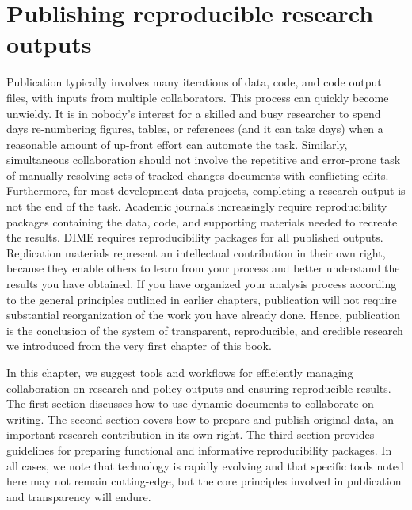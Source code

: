 \documentclass[
]{book}
\begin{document}
\hypertarget{publication}{%
\chapter{Publishing reproducible research outputs}\label{publication}}

Publication typically involves many iterations of
data, code, and code output files, with inputs from multiple collaborators.
This process can quickly become unwieldy.
It is in nobody's interest for a skilled and busy researcher
to spend days re-numbering figures, tables, or references (and it can take days)
when a reasonable amount of up-front effort can automate the task.
Similarly, simultaneous collaboration should not involve
the repetitive and error-prone task of manually resolving
sets of tracked-changes documents with conflicting edits.
Furthermore, for most development data projects,
completing a research output is not the end of the task.
Academic journals increasingly require reproducibility packages
containing the data, code, and supporting materials
needed to recreate the results.
DIME requires reproducibility packages for all published outputs.
Replication materials represent an intellectual contribution in their own right,
because they enable others to learn from your process
and better understand the results you have obtained.
If you have organized your analysis process
according to the general principles outlined in earlier chapters,
publication will not require
substantial reorganization of the work you have already done.
Hence, publication is the conclusion of the system
of transparent, reproducible, and credible research we introduced
from the very first chapter of this book.

In this chapter, we suggest tools and workflows for
efficiently managing collaboration on research and policy outputs
and ensuring reproducible results.
The first section discusses how to use dynamic documents to collaborate on writing.
The second section covers how to prepare and publish original data,
an important research contribution in its own right.
The third section provides guidelines for preparing
functional and informative reproducibility packages.
In all cases, we note that technology is rapidly evolving
and that specific tools noted here may not remain cutting-edge,
but the core principles involved in publication and transparency will endure.
\end{document}
